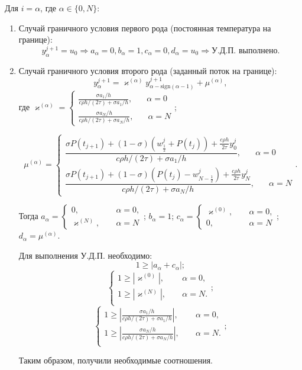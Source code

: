 \documentclass[12pt, a4paper]{article}
\begin{document}
	Для $i=\alpha$, где $\alpha \in \{0, N\}$:
	\begin{enumerate}
		\item Случай граничного условия первого рода (постоянная температура на границе):
		\[
		y_\alpha^{j+1} = u_0 \Rightarrow 
		a_\alpha = 0, b_\alpha = 1, c_\alpha = 0, d_\alpha = u_0 \Rightarrow \text{У.Д.П. выполнено.}
		\]
		
		\item Случай граничного условия второго рода (заданный поток на границе):
		\[
		y_\alpha^{j+1} = \varkappa^{(\alpha)} y_{\alpha - \text{sign}(\alpha-1)}^{j+1} + \mu^{(\alpha)} ,
		\]
		где $\varkappa^{(\alpha)} = 
		\begin{cases}
			 \frac{\sigma a_1 /h}{c\rho h/(2\tau) + \sigma a_1/h}, \phantom{xxx} \alpha = 0\\
			 \frac{\sigma a_N /h}{c\rho h/(2\tau) + \sigma a_N/h}, \phantom{xxx} \alpha = N
		\end{cases}$;
	
	\[
	\mu^{(\alpha)} = \begin{cases}
		\dfrac{\sigma P(t_{j+1})+(1-\sigma)(w_{\frac12}^j + P(t_j)) + \frac{c \rho h}{2\tau}y_0^j}{c\rho h / (2\tau) + \sigma a_1/h}, \phantom{xxx} \alpha = 0\\
		\dfrac{\sigma P(t_{j+1})+(1-\sigma)(P(t_j)-w_{N-\frac12}^j) + \frac{c \rho h}{2\tau}y_N^j}{c\rho h / (2\tau) + \sigma a_N/h}, \phantom{xxx} \alpha = N
	\end{cases}.
	\]
	
	Тогда $a_{\alpha}= \begin{cases}
		0,& \phantom{xx} \alpha = 0,\\
		\varkappa^{(N)},& \phantom{xx} \alpha = N
	\end{cases}$;
	$b_{\alpha}= 1$; 
	$c_{\alpha}= \begin{cases}
		\varkappa^{(0)},& \phantom{xx} \alpha = 0,\\
		 0,& \phantom{xx} \alpha = N
	\end{cases}$; 
	$d_{\alpha}= \mu^{(\alpha)}$. 
	
	Для выполнения У.Д.П. необходимо:
	\[
	1 \ge |a_{\alpha} + c_{\alpha}|; 
	\]
	\[
	\begin{cases}
		1 \ge \left|\varkappa^{(0)}\right|,& \phantom{xx} \alpha = 0,\\
		1 \ge \left|\varkappa^{(N)}\right|,& \phantom{xx} \alpha = N.\\
	\end{cases};
	\]
	\[
	\begin{cases}
		1 \ge \left| \frac{\sigma a_1 /h}{c\rho h/(2\tau) + \sigma a_1/h}\right|,& \phantom{xx} \alpha = 0,\\
		1 \ge \left| \frac{\sigma a_N /h}{c\rho h/(2\tau) + \sigma a_N/h}\right|,& \phantom{xx} \alpha = N.\\
	\end{cases};
	\]
	
	Таким образом, получили необходимые соотношения.
	\end{enumerate}
	
\end{document}
